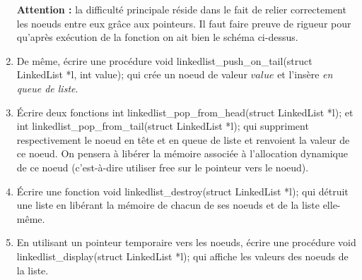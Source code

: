 \documentclass[../../../main.tex]{subfiles}
\begin{document}
\begin{enumerate}
	\textbf{Attention :} la difficulté principale réside dans le fait de relier correctement les noeuds entre eux grâce aux pointeurs. Il faut faire preuve de rigueur pour qu'après exécution de la fonction on ait bien le schéma ci-dessus.
	\item De même, écrire une procédure \textsf{void linkedlist\_push\_on\_tail(struct LinkedList *l, int value);} qui crée un noeud de valeur $value$ et l'insère \textit{en queue de liste}.
	\item Écrire deux fonctions \textsf{int linkedlist\_pop\_from\_head(struct LinkedList *l);} et \textsf{int linkedlist\_pop\_from\_tail(struct LinkedList *l);} qui suppriment respectivement le noeud en tête et en queue de liste et renvoient la valeur de ce noeud. On pensera à libérer la mémoire associée à l'allocation dynamique de ce noeud (c'est-à-dire utiliser \textsf{free} sur le pointeur vers le noeud).
	\item Écrire une fonction \textsf{void linkedlist\_destroy(struct LinkedList *l);} qui détruit une liste en libérant la mémoire de chacun de ses noeuds et de la liste elle-même.
	\item En utilisant un pointeur temporaire vers les noeuds, écrire une procédure \textsf{void linkedlist\_display(struct LinkedList *l);} qui affiche les valeurs des noeuds de la liste.
\end{enumerate}
\end{document}
